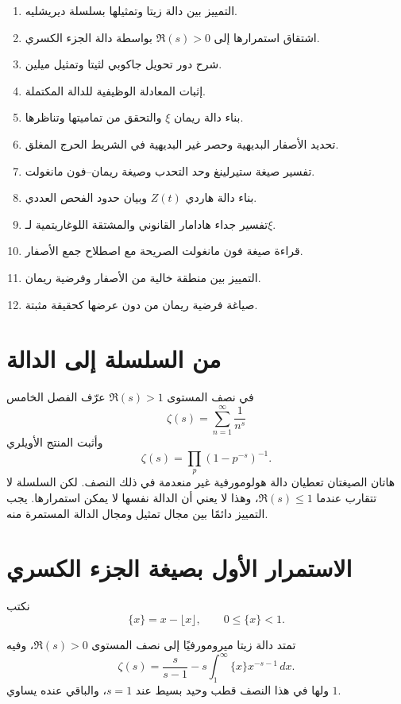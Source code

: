 \begin{enumerate}
  \item التمييز بين دالة زيتا وتمثيلها بسلسلة ديريشليه.
  \item اشتقاق استمرارها إلى \(\Re(s)>0\) بواسطة دالة الجزء الكسري.
  \item شرح دور تحويل جاكوبي لثيتا وتمثيل ميلين.
  \item إثبات المعادلة الوظيفية للدالة المكتملة.
  \item بناء دالة ريمان \(\xi\) والتحقق من تماميتها وتناظرها.
  \item تحديد الأصفار البديهية وحصر غير البديهية في الشريط الحرج المغلق.
  \item تفسير صيغة ستيرلينغ وحد التحدب وصيغة ريمان--فون مانغولت.
  \item بناء دالة هاردي \(Z(t)\) وبيان حدود الفحص العددي.
  \item تفسير جداء هادامار القانوني والمشتقة اللوغاريتمية لـ\(\xi\).
  \item قراءة صيغة فون مانغولت الصريحة مع اصطلاح جمع الأصفار.
  \item التمييز بين منطقة خالية من الأصفار وفرضية ريمان.
  \item صياغة فرضية ريمان من دون عرضها كحقيقة مثبتة.
\end{enumerate}

\section{من السلسلة إلى الدالة}

في نصف المستوى \(\Re(s)>1\) عرّف الفصل الخامس
\[
\zeta(s)=\sum_{n=1}^{\infty}\frac1{n^s}
\]
وأثبت المنتج الأويلري
\[
\zeta(s)=\prod_p(1-p^{-s})^{-1}.
\]
هاتان الصيغتان تعطيان دالة هولومورفية غير منعدمة في ذلك النصف. لكن
السلسلة لا تتقارب عندما \(\Re(s)\leq1\)، وهذا لا يعني أن الدالة نفسها
لا يمكن استمرارها. يجب التمييز دائمًا بين مجال تمثيل ومجال الدالة
المستمرة منه.

\section{الاستمرار الأول بصيغة الجزء الكسري}

نكتب
\[
\{x\}=x-\lfloor x\rfloor,
\qquad 0\leq\{x\}<1.
\]

\begin{theorem}
\label{thm:zeta-fractional-part-continuation}
\provedhere
تمتد دالة زيتا ميرومورفيًا إلى نصف المستوى \(\Re(s)>0\)، وفيه
\[
\zeta(s)
=
\frac{s}{s-1}
-
s\int_1^\infty \{x\}x^{-s-1}\,dx.
\]
ولها في هذا النصف قطب وحيد بسيط عند \(s=1\)، والباقي عنده يساوي \(1\).
\end{theorem}

